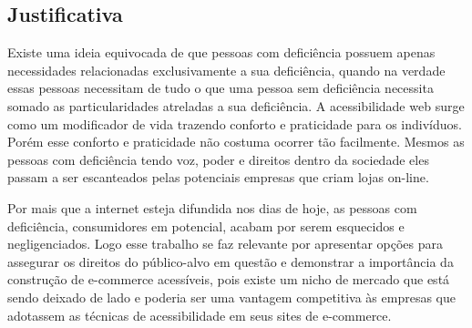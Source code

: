 \subsection{Justificativa}

{


Existe uma ideia equivocada de que pessoas com deficiência possuem apenas necessidades relacionadas exclusivamente a sua deficiência, quando na verdade essas pessoas necessitam de tudo o que uma pessoa sem deficiência necessita somado as particularidades atreladas a sua deficiência. A acessibilidade web surge como um modificador de vida trazendo conforto e praticidade para os indivíduos. Porém esse conforto e praticidade não costuma ocorrer tão facilmente. Mesmos as pessoas com deficiência tendo voz, poder e direitos dentro da sociedade eles passam a ser escanteados pelas potenciais empresas que criam lojas on-line. 

Por mais que a internet esteja difundida nos dias de hoje, as pessoas com deficiência, consumidores em potencial, acabam por serem esquecidos e negligenciados. Logo esse trabalho se faz relevante por apresentar opções para assegurar os direitos do público-alvo em questão e 
demonstrar a importância da construção de e-commerce acessíveis, pois existe um nicho de mercado que está sendo deixado de lado e poderia ser uma vantagem competitiva às empresas que adotassem as técnicas de acessibilidade em seus sites de e-commerce.
}
